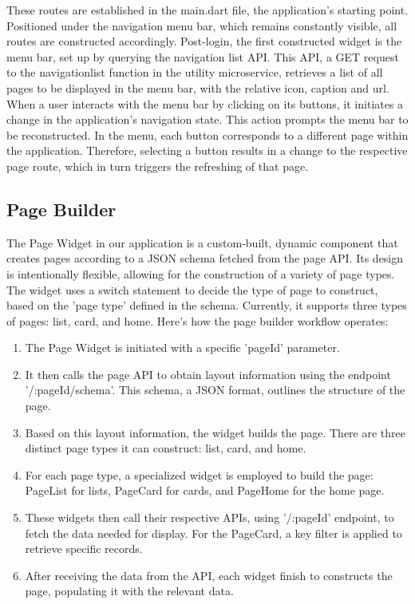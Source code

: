 These routes are established in the main.dart file, the application's starting point. Positioned
under the navigation menu bar, which remains constantly visible, all routes are constructed
accordingly. Post-login, the first constructed widget is the menu bar, set up by querying the
navigation list API. This API, a GET request to the navigationlist function in the utility
microservice, retrieves a list of all pages to be displayed in the menu bar, with the relative icon,
caption and url. When a user interacts with the menu bar by clicking on its buttons, it initiates a
change in the application's navigation state. This action prompts the menu bar to be reconstructed.
In the menu, each button corresponds to a different page within the application. Therefore,
selecting a button results in a change to the respective page route, which in turn triggers the
refreshing of that page.

\subsection{Page Builder}
The Page Widget in our application is a custom-built, dynamic component that creates pages according
to a JSON schema fetched from the page API. Its design is intentionally flexible, allowing for the
construction of a variety of page types. The widget uses a switch statement to decide the type of
page to construct, based on the 'page type' defined in the schema. Currently, it supports three
types of pages: list, card, and home. Here's how the page builder workflow operates:


\begin{enumerate}
    \item The Page Widget is initiated with a specific 'pageId' parameter.
    \item It then calls the page API to obtain layout information using the endpoint
          '/:pageId/schema'. This schema, a JSON format, outlines the structure of the page.
    \item Based on this layout information, the widget builds the page. There are three distinct
          page types it can construct: list, card, and home.
    \item For each page type, a specialized widget is employed to build the page: PageList for
          lists, PageCard for cards, and PageHome for the home page.
    \item These widgets then call their respective APIs, using '/:pageId' endpoint, to fetch the
          data needed for display. For the PageCard, a key filter is applied to retrieve specific records.
    \item After receiving the data from the API, each widget finish to constructs the page,
          populating it with the relevant data.
\end{enumerate}

